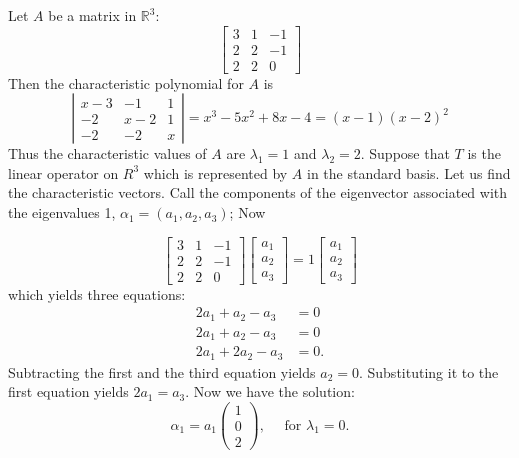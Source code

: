 \documentclass[main.tex]{subfiles}
\begin{document}
\begin{example}
    Let $A$ be a matrix in $\mathbb{R}^3$:
$$
\left[\begin{array}{rrr}
3 & 1 & -1 \\
2 & 2 & -1 \\
2 & 2 & 0
\end{array}\right]
$$
Then the characteristic polynomial for $A$ is
$$
\left|\begin{array}{ccc}
x-3 & -1 & 1 \\
-2 & x-2 & 1 \\
-2 & -2 & x
\end{array}\right|=x^3-5 x^2+8 x-4=(x-1)(x-2)^2
$$
Thus the characteristic values of $A$ are $\lambda_1 = 1$ and $\lambda_2 = 2$.
Suppose that $T$ is the linear operator on $R^3$ which is represented by $A$ in the standard basis. Let us find the characteristic vectors. Call the components of the eigenvector associated with the eigenvalues 1, $\alpha_1 = \left(a_1, a_2, a_3\right)$; Now

$$
\left[\begin{array}{rrr}
3 & 1 & -1 \\
2 & 2 & -1 \\
2 & 2 & 0
\end{array}\right]
\left[\begin{array}{l}
a_1 \\
a_2 \\
a_3
\end{array}\right]=
1
\left[\begin{array}{l}
a_1 \\
a_2 \\
a_3
\end{array}\right]
$$
which yields three equations:
$$
\begin{aligned}
2 a_1 + a_2 -  a_3 & =0 \\
2 a_1 + a_2 -  a_3 & =0 \\
2 a_1 + 2a_2 -  a_3 & =0.
\end{aligned}
$$
Subtracting the first and the third equation yields $a_2 = 0$. Substituting it to the first equation yields $2a_1 = a_3$. 
Now we have the solution: 
$$
\alpha_1=a_1\left(\begin{array}{l}
1 \\
0 \\
2
\end{array}\right), \quad \text { for } \lambda_1=0.
$$


\end{example}
\end{document}
